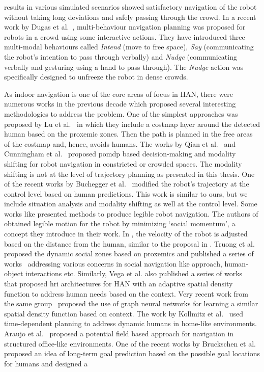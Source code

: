 results in various simulated scenarios showed satisfactory navigation of the robot without taking long deviations and safely passing through the crowd. In a recent work by Dugas et al.~\cite{dugas2020ian}, multi-behaviour navigation planning was proposed for robots in a crowd using some interactive actions. They have introduced three multi-modal behaviours called \textit{Intend} (move to free space), \textit{Say} (communicating the robot’s intention to pass through verbally) and \textit{Nudge} (communicating verbally and gesturing using a hand to pass through). The \textit{Nudge} action was specifically designed to unfreeze the robot in dense crowds.

As indoor navigation is one of the core areas of focus in HAN, there were numerous works in the previous decade which proposed several interesting methodologies to address the problem. One of the simplest approaches was proposed by Lu et al.~\cite{lu2013towards} in which they include a costmap layer around the detected human based on the proxemic zones. Then the path is planned in the free areas of the costmap and, hence, avoids humans. The works by Qian et al.~\cite{qian2013decision} and Cunningham et al.~\cite{cunningham2015mpdm} proposed \acrshort{pomdp} based decision-making and modality shifting for robot navigation in constricted or crowded spaces. The modality shifting is not at the level of trajectory planning as presented in this thesis. One of the recent works by Buchegger et al.~\cite{buchegger2018safe} modified the robot’s trajectory at the control level based on human predictions. This work is similar to ours, but we include situation analysis and modality shifting as well at the control level. Some works like \cite{mavrogiannis2018social, vasconcelos2015socially} presented methods to produce legible robot navigation. The authors of \cite{mavrogiannis2018social} obtained legible motion for the robot by minimizing `social momentum’, a concept they introduce in their work. In \cite{vasconcelos2015socially}, the velocity of the robot is adjusted based on the distance from the human, similar to the proposal in \cite{kruse2012legible}. Truong et al.~\cite{truong2014dynamic} proposed the dynamic social zones based on proxemics and published a series of works~\cite{truong2017approach, truong2016towards, truong2017socially} addressing various concerns in social navigation like approach, human-object interactions etc. Similarly, Vega et al. also published a series of works~\cite{vega2017new, vega2018flexible} that proposed \acrshort{hri} architectures for HAN with an adaptive spatial density function to address human needs based on the context. Very recent work from the same group~\cite{manso2020graph} proposed the use of graph neural networks for learning a similar spatial density function based on context. The work by Kollmitz et al.~\cite{kollmitz2015time} used time-dependent planning to address dynamic humans in home-like environments. Araujo et al.~\cite{araujo2015architecture} proposed a potential field based approach for navigation in structured office-like environments. One of the recent works by Bruckschen et al.~\cite{bruckschen2020human} proposed an idea of long-term goal prediction based on the possible goal locations for humans and designed a 